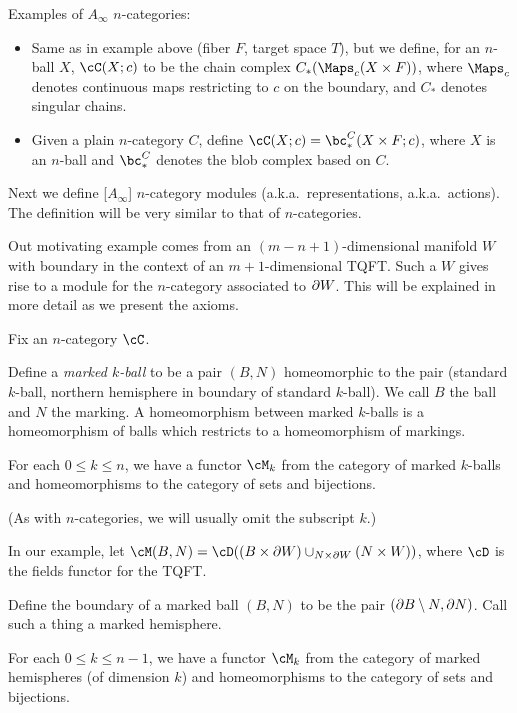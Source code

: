 Examples of $A_\infty$ $n$-categories:
\begin{itemize}

\item Same as in example  above (fiber $F$, target space $T$),
but we define, for an $n$-ball $X$, $\cC(X; c)$ to be the chain complex 
$C_*(\Maps_c(X\times F))$, where $\Maps_c$ denotes continuous maps restricting to $c$ on the boundary,
and $C_*$ denotes singular chains.

\item
Given a plain $n$-category $C$, 
define $\cC(X; c) = \bc^C_*(X\times F; c)$, where $X$ is an $n$-ball
and $\bc^C_*$ denotes the blob complex based on $C$.

\end{itemize}

\medskip

Next we define [$A_\infty$] $n$-category modules (a.k.a.\ representations,
a.k.a.\ actions).
The definition will be very similar to that of $n$-categories.

Out motivating example comes from an $(m{-}n{+}1)$-dimensional manifold $W$ with boundary
in the context of an $m{+}1$-dimensional TQFT.
Such a $W$ gives rise to a module for the $n$-category associated to $\partial W$.
This will be explained in more detail as we present the axioms.

Fix an $n$-category $\cC$.

Define a {\it marked $k$-ball} to be a pair $(B, N)$ homeomorphic to the pair
(standard $k$-ball, northern hemisphere in boundary of standard $k$-ball).
We call $B$ the ball and $N$ the marking.
A homeomorphism between marked $k$-balls is a homeomorphism of balls which
restricts to a homeomorphism of markings.

{For each $0 \le k \le n$, we have a functor $\cM_k$ from 
the category of marked $k$-balls and 
homeomorphisms to the category of sets and bijections.}

(As with $n$-categories, we will usually omit the subscript $k$.)

In our example, let $\cM(B, N) = \cD((B\times \bd W)\cup_{N\times \bd W} (N\times W))$, 
where $\cD$ is the fields functor for the TQFT.

Define the boundary of a marked ball $(B, N)$ to be the pair $(\partial B \setminus N, \partial N)$.
Call such a thing a {marked hemisphere}.

{For each $0 \le k \le n-1$, we have a functor $\cM_k$ from 
the category of marked hemispheres (of dimension $k$) and 
homeomorphisms to the category of sets and bijections.}


